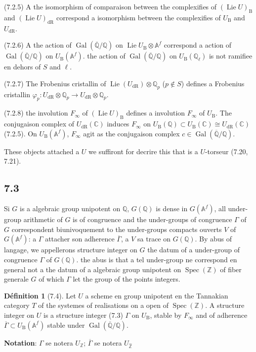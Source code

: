 \documentclass[12pt,a4paper]{article}
\theoremstyle{plain}
\theoremstyle{definition}
\newtheorem{definition}[theorem]{D\'efinition}
\theoremstyle{remark}
\DeclareMathOperator{\Spec}{Spec}
\DeclareMathOperator{\Gal}{Gal}
\DeclareMathOperator{\Lie}{Lie}
\newcommand{\DR}{\mathrm{dR}}
\newcommand{\B}{\mathrm{B}}
\newcommand{\Z}{\mathbb{Z}}
\newcommand{\Q}{\mathbb{Q}}
\newcommand{\C}{\mathbb{C}}
\newcommand{\A}{\mathbb{A}}
\begin{document}
(7.2.5) A the isomorphism of comparaison between the complexifies of $(\Lie U)_\B$ and $(\Lie U)_\DR$ correspond a isomorphism between the complexifies of $U_\B$ and $U_\DR$.

(7.2.6) A the action of $\Gal(\overline{\Q}/\Q)$ on $\Lie U_\B 
\otimes 
\A^f$ correspond a action of $\Gal(\overline{\Q}/\Q)$ on $U_\B(\A^f)$. the action of $\Gal(\overline{\Q}/\Q)$ on $U_\B(\Q_\ell)$ is not ramifiee en dehors of $S$ and $\ell$.

(7.2.7) The Frobenius cristallin of $\Lie(U_\DR) 
\otimes 
\Q_p$ ($p 
\notin S$) defines a Frobenius cristallin $\varphi_p: U_\DR 
\otimes 
\Q_p 
\to U_\DR 
\otimes 
\Q_p$.

(7.2.8) the involution $F_\infty$ of $(\Lie U)_\B$ defines a involution $F_\infty$ of $U_\B$. The conjugaison complex of $U_\DR(\C)$ induces $F_\infty$ on $U_\B(\Q) 
\subset U_\B(\C) 
\cong U_\DR(\C)$ (7.2.5). On $U_\B(\A^f)$, $F_\infty$ agit as the conjugaison complex $c 
\in 
\Gal(\overline{\Q}/\Q)$.

These objects attached a $U$ we suffiront for decrire this that is a $U$-torseur (7.20, 7.21).

\subsection*{7.3}
Si $G$ is a algebraic group unipotent on $\Q$, $G(\Q)$ is dense in $G(\A^f)$, all under-group arithmetic of $G$ is of congruence and the under-groups of congruence $\Gamma$ of $G$ correspondent biunivoquement to the under-groups compacts ouverts $V$ of $G(\A^f)$: a $\Gamma$ attacher son adherence $\overline{\Gamma}$, a $V$ sa trace on $G(\Q)$. By abus of langage, we appellerons structure integer on $G$ the datum of a under-group of congruence $\Gamma$ of $G(\Q)$. the abus is that a tel under-group ne correspond en general not a the datum of a algebraic group unipotent on $\Spec(\Z)$ of fiber generale $G$ of which $\Gamma$ let the group of the points integers.

\begin{definition}[7.4]\label{def:7.4}
Let $U$ a scheme en group unipotent en the Tannakian category $T$ of the systemes of realisations on a open of $\Spec(\Z)$. A structure integer on $U$ is a structure integer (7.3) $\Gamma$ on $U_\B$, stable by $F_\infty$ and of adherence $\overline{\Gamma} 
\subset U_\B(\A^f)$ stable under $\Gal(\overline{\Q}/\Q)$.
\end{definition}

\textbf{Notation}: $\Gamma$ se notera $U_\Z$; $\overline{\Gamma}$ se notera $U_{\hat{\Z}}$
\end{document}
